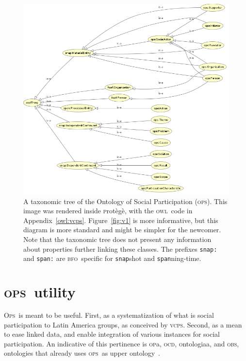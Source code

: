 \documentclass[10pt,letterpaper]{article}
\newcommand{\ops}{\textsc{ops}}
\newcommand{\opsi}{O\textsc{ps}}
\newcommand{\vcps}{\textsc{vcps}}
\newcommand{\owl}{\textsc{owl}}
\newcommand{\bfo}{\textsc{bfo}}
\newcommand{\opa}{\textsc{op}a}
\newcommand{\ocd}{\textsc{ocd}}
\newcommand{\ontologiaa}{\textsc{o}ntologiaa}
\newcommand{\obs}{\textsc{obs}}
\newcommand{\protege}{\textsc{p}rot\`eg\`e}
\begin{document}
\begin{figure}
    \centering
    \includegraphics[width=\textwidth]{figs/opsTax}
    \caption{A taxonomic tree of the Ontology of Social Participation (\ops). This image was rendered inside \protege, with the \owl\ code in Appendix~\ref{owl:vcps}. Figure~\ref{fig:v1} is more informative, but this diagram is more standard and might be simpler for the newcomer. Note that the taxonomic tree does not present any information about properties further linking these classes. The prefixes {\tt snap:} and {\tt span:} are \bfo\ specific for {\tt snap}shot and {\tt span}ning-time.}
    \label{fig:owlCC}
\end{figure}


\section{\ops\ utility}\label{ospUtil}
\opsi\ is meant to be useful. First, as a systematization of what is social participation to Latin America groups, as conceived by \vcps. Second, as a mean to ease linked data, and enable integration of various instances for social participation. An indicative of this pertinence is \opa, \ocd, \ontologiaa, and \obs, ontologies that already uses \ops\ as upper ontology~\cite{pnud5}.
\end{document}
